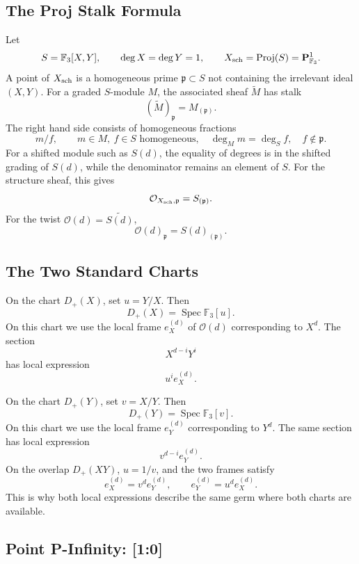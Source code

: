 \subsection{The Proj Stalk Formula}

Let
\[
  S=\mathbb F_3[X,Y],\qquad \deg X=\deg Y=1,\qquad
  X_{\rm sch}=\operatorname{Proj}(S)=\mathbf P^1_{\mathbb F_3}.
\]
A point of \(X_{\rm sch}\) is a homogeneous prime
\(\mathfrak p\subset S\) not containing the irrelevant ideal \((X,Y)\).
For a graded \(S\)-module \(M\), the associated sheaf \(\widetilde M\) has
stalk
\[
  (\widetilde M)_{\mathfrak p}=M_{(\mathfrak p)}.
\]
The right hand side consists of homogeneous fractions
\[
  m/f,\qquad m\in M,\ f\in S \text{ homogeneous},\quad
  \deg_M m=\deg_S f,\quad f\notin\mathfrak p.
\]
For a shifted module such as \(S(d)\), the equality of degrees is in the
shifted grading of \(S(d)\), while the denominator remains an element of
\(S\).
For the structure sheaf, this gives
\[
  \mathcal O_{X_{\rm sch},\mathfrak p}=S_{(\mathfrak p)}.
\]
For the twist \(\mathcal O(d)=\widetilde{S(d)}\),
\[
  \mathcal O(d)_{\mathfrak p}=S(d)_{(\mathfrak p)}.
\]

\subsection{The Two Standard Charts}

On the chart \(D_+(X)\), set \(u=Y/X\).  Then
\[
  D_+(X)=\operatorname{Spec}\mathbb F_3[u].
\]
On this chart we use the local frame \(e_X^{(d)}\) of \(\mathcal O(d)\)
corresponding to \(X^d\).  The section
\[
  X^{d-i}Y^i
\]
has local expression
\[
  u^i e_X^{(d)}.
\]

On the chart \(D_+(Y)\), set \(v=X/Y\).  Then
\[
  D_+(Y)=\operatorname{Spec}\mathbb F_3[v].
\]
On this chart we use the local frame \(e_Y^{(d)}\) corresponding to \(Y^d\).
The same section has local expression
\[
  v^{d-i}e_Y^{(d)}.
\]
On the overlap \(D_+(XY)\), \(u=1/v\), and the two frames satisfy
\[
  e_X^{(d)}=v^d e_Y^{(d)},\qquad e_Y^{(d)}=u^d e_X^{(d)}.
\]
This is why both local expressions describe the same germ where both charts
are available.

\subsection{Point P-Infinity: [1:0]}

